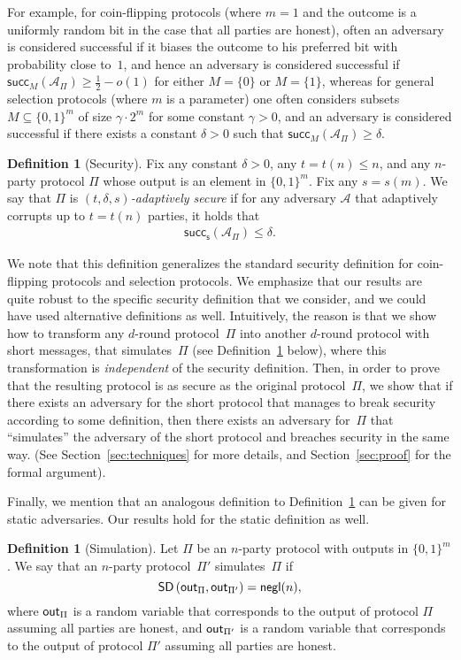 \documentclass[11pt]{article}
\theoremstyle{plain}
\theoremstyle{definition}
\newtheorem{definition}[theorem]{Definition}
\numberwithin{equation}{section}
\numberwithin{equation}{section} \newcommand{\aka} {also known as\ }
\newcommand{\B}{\{ 0,1 \}}
\newcommand{\1}{\mathbf{1}}
\newcommand{\Adv}{\mathcal A}
\newcommand{\negl}{{\mathsf{negl}}}
\newcommand{\SD}{\mathsf{SD}}
\newcommand{\success}{{\mathsf{succ}}}
\newcommand{\successset}{{\mathsf{succ_{s}}}}
\newcommand{\valset}[2]{{\successset(#2_{#1})}}
\newcommand{\valb}[3]{{\success_{#1}(#3_{#2})}}
\theoremstyle{remark}
\begin{document}
For example, for coin-flipping protocols (where $m=1$ and the outcome is a
uniformly random bit in the case that all parties are honest), often an
adversary is considered successful if it biases the outcome to his preferred bit
with probability close to~$1$, and hence an adversary is considered successful
if $\valb{M}{\Pi}{\Adv}\geq\frac{1}{2}-o(1)$ for either $M=\{0\}$ or
$M=\{1\}$, whereas for general selection protocols (where $m$ is a parameter)
one often considers subsets $M\subseteq\{0,1\}^m$ of size $\gamma\cdot2^m$ for
some constant $\gamma>0$, and an adversary is considered successful if there
exists a constant $\delta>0$ such that $\valb{M}{\Pi}{\Adv}\geq\delta$.

\begin{definition}[Security]\label{def:sec}
  Fix any constant $\delta>0$, any $t=t(n)\leq n$, and any $n$-party protocol
  $\Pi$ whose output is an element in $\B^m$.  Fix any $s=s(m)$.  We say that
  $\Pi$ is \emph{$(t,\delta,s)$-adaptively secure} if
  for any adversary $\Adv$ that adaptively
  corrupts up to $t=t(n)$ parties, it holds that
  \begin{align*}
    \valset{\Pi}{\Adv} \leq\delta.
  \end{align*}
\end{definition}
We note that this definition generalizes the standard security definition for coin-flipping protocols and selection protocols.
We emphasize that our results are quite robust to the specific security definition that we consider, and we could have used alternative definitions as well. Intuitively, the reason is that we  show how to transform any $d$-round protocol~$\Pi$ into another $d$-round protocol with short messages, that simulates~$\Pi$ (see Definition~\ref{def:sim} below), where this transformation is {\em independent} of the security definition.  Then, in order to prove that the resulting protocol is as secure as the original protocol~$\Pi$, we show that if there exists an adversary for the short protocol that manages to break security according to some definition, then there exists an adversary for~$\Pi$ that ``simulates'' the adversary of the short protocol and breaches security in the same way.
(See Section~\ref{sec:techniques} for more details, and Section~\ref{sec:proof} for the formal argument).

Finally, we mention that an analogous definition to Definition~\ref{def:sec} can be given for static adversaries.  Our results hold for the static definition as well.

\begin{definition}[Simulation]\label{def:sim}
Let $\Pi$ be an $n$-party protocol with outputs in $\{0,1\}^m$.  We say that an $n$-party protocol~$\Pi'$ simulates~$\Pi$ if
$$
\SD\left({\sf out}_\Pi,{\sf out}_{\Pi'}\right)=\negl(n),
$$
where ${\sf out}_\Pi$ is a random variable that corresponds to the output of
protocol $\Pi$ assuming all parties are honest, and ${\sf out}_{\Pi'}$ is a random variable that corresponds to the output of protocol $\Pi'$ assuming all parties are honest.
\end{definition}
\end{document}
